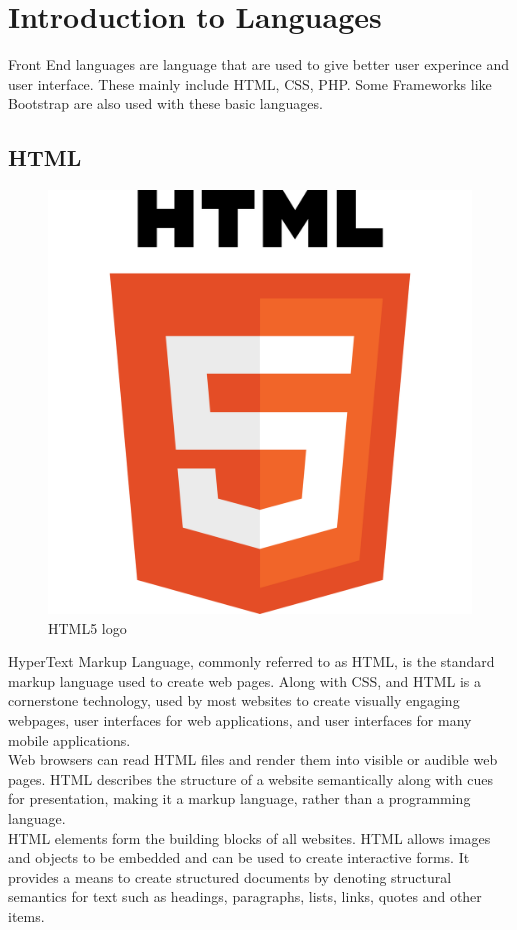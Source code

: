 \section{Introduction to Languages}
Front End languages are language that are used to give better user experince and user interface. These mainly include HTML, CSS, PHP. Some Frameworks like Bootstrap are also used with these basic languages.
\subsection{HTML}

\begin{figure}[h]
\centering \includegraphics[scale=0.05]{images/HTML.png}
\caption{HTML5 logo}
\end{figure}
HyperText Markup Language, commonly referred to as HTML, is the standard markup language used to create web pages. Along with CSS, and HTML is a cornerstone technology, used by most websites to create visually engaging webpages, user interfaces for web applications, and user interfaces for many mobile applications. \\
Web browsers can read HTML files and render them into visible or audible web pages. HTML describes the structure of a website semantically along with cues for presentation, making it a markup language, rather than a programming language.\\
HTML elements form the building blocks of all websites. HTML allows images and objects to be embedded and can be used to create interactive forms. It provides a means to create structured documents by denoting structural semantics for text such as headings, paragraphs, lists, links, quotes and other items.


